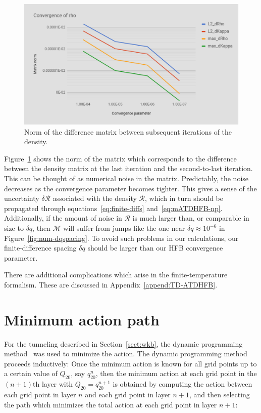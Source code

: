 \begin{figure}
	\centering
	\includegraphics[width=0.7\linewidth]{TeX_files/Num-rho_conv}
	\caption[Norm of the difference matrix between subsequent iterations of the density]{Norm of the difference matrix between subsequent iterations of the density.}
	\label{fig:num-rhoconv}
\end{figure}

Figure~\ref{fig:num-rhoconv} shows the norm of the matrix which corresponds to the difference between the density matrix at the last iteration and the second-to-last iteration. This can be thought of as numerical noise in the matrix. Predictably, the noise decreases as the convergence parameter becomes tighter. This gives a sense of the uncertainty $\delta \mathcal{R}$ associated with the density $\mathcal{R}$, which in turn should be propagated through equations~\eqref{eq:finite-diffs} and~\eqref{eq:mATDHFB-np}. Additionally, if the amount of noise in $\mathcal{R}$ is much larger than, or comparable in size to $\delta q$, then $\mathcal{M}$ will suffer from jumps like the one near $\delta q \approx 10^{-6}$ in Figure~\ref{fig:num-dqspacing}. To avoid such problems in our calculations, our finite-difference spacing $\delta q$ should be larger than our HFB convergence parameter.

There are additional complications which arise in the finite-temperature formalism. These are discussed in Appendix~\ref{append:TD-ATDHFB}.

\section{Minimum action path}
For the tunneling described in Section~\ref{sect:wkb}, the dynamic programming method~\cite{Baran1981} was used to minimize the action. The dynamic programming method proceeds inductively: Once the minimum action is known for all grid points up to a certain value of $Q_{20}$, say $q_{20}^n$, then the minimum action at each grid point in the $(n+1)$th layer with $Q_{20}=q_{20}^{n+1}$ is obtained by computing the action between each grid point in layer $n$ and each grid point in layer $n+1$, and then selecting the path which minimizes the total action at each grid point in layer $n+1$:

